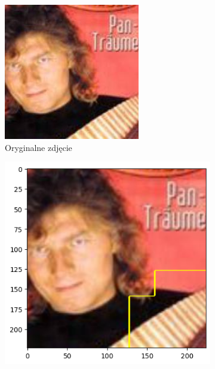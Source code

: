 \begin{figure}[h]
	\centering
	\begin{subfigure}[b]{0.3\textwidth}
		\includegraphics[width=.9\textwidth]{img/examples/appendix/n03884397_34878}
		\caption{Oryginalne zdjęcie}  \label{}
	\end{subfigure}
	\begin{subfigure}[b]{0.3\textwidth}
		\centering\includegraphics[width=.9\textwidth]{img/examples/appendix/n03884397_34878_gradcam}

\end{subfigure}
\end{figure}
